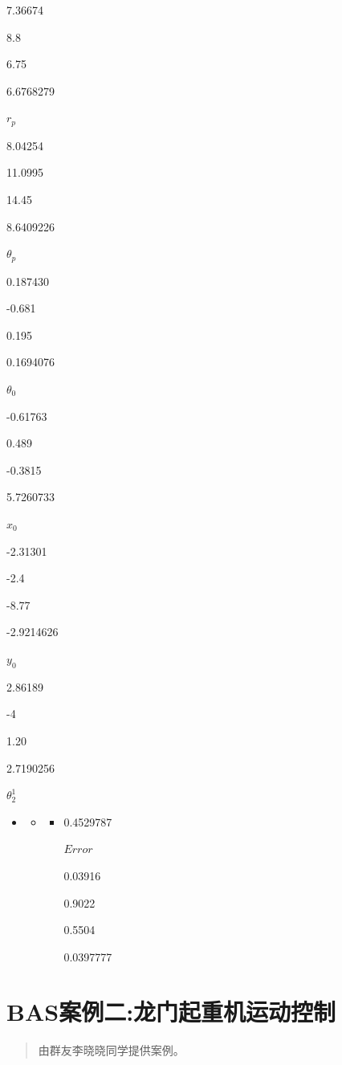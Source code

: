 \documentclass[]{ctexbook}
\theoremstyle{definition}
\theoremstyle{definition}
\theoremstyle{definition}
\theoremstyle{remark}
\begin{document}
7.36674

8.8

6.75

6.6768279

\(r_p\)

8.04254

11.0995

14.45

8.6409226

\(θ_p\)

0.187430

-0.681

0.195

0.1694076

\(θ_0\)

-0.61763

0.489

-0.3815

5.7260733

\(x_0\)

-2.31301

-2.4

-8.77

-2.9214626

\(y_0\)

2.86189

-4

1.20

2.7190256

\(θ_2^1\)

\begin{itemize}
\item
  \begin{itemize}
  \item
    \begin{itemize}
    \item
      0.4529787

      \(Error\)

      0.03916

      0.9022

      0.5504

      0.0397777
    \end{itemize}
  \end{itemize}
\end{itemize}

\chapter{BAS案例二:龙门起重机运动控制}\label{examples2}

\begin{quote}
由群友李晓晓同学提供案例。
\end{quote}
\end{document}
